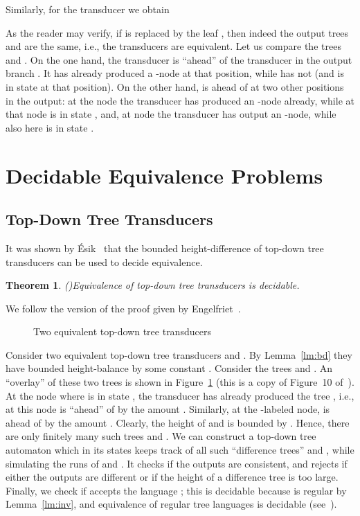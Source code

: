 \documentclass[copyright,creativecommons]{eptcs}
\newtheorem{theorem}{Theorem}
\newcommand{\eop}{\hspace*{\fill}}
\newenvironment{proof}{{\it Proof.}\quad}{\eop\vspace*{4mm}}
\begin{document}
Similarly, for the transducer  we obtain

As the reader may verify, if  is replaced by the leaf , then
indeed the output trees  and  are the same, i.e.,
the transducers are equivalent.
Let us compare the trees  and .
On the one hand, the transducer  is ``ahead'' of the transducer
 in the output branch . It has already produced a -node at
that position, while  has not (and is in state  at that position).
On the other hand,  is ahead of  at two other positions in the
output: at the node  the transducer  has produced an -node
already, while  at that node is in state , and,
at node  the transducer  has output an -node, while
also here  is in state .

\section{Decidable Equivalence Problems}\label{sect:equiv}

\subsection{Top-Down Tree Transducers}\label{sect:td}

It was shown by {\'E}sik~\cite{DBLP:journals/actaC/Esik81} 
that the bounded height-difference 
of top-down tree transducers can be used to decide equivalence. 

\begin{theorem}\rm(\cite{DBLP:journals/actaC/Esik81})\label{theo:Esik}
Equivalence of top-down tree transducers is decidable.
\end{theorem}
\begin{proof}
We follow the version of the proof given by Engelfriet~\cite{eng80}.
\begin{figure}[htb]
\centerline{}
\caption{Two equivalent top-down tree transducers}\label{fig:joost}
\end{figure}
Consider two equivalent top-down tree transducers  and .
By Lemma~\ref{lm:bd} they have bounded height-balance by some constant .
Consider the trees  and
. An ``overlay'' of these two trees is
shown in Figure~\ref{fig:joost} (this is a copy of Figure~10 of~\cite{eng80}).
At the node where  is in state , the transducer  has
already produced the tree , i.e., at this node 
 is ``ahead'' of  by the amount .
Similarly, at the -labeled node,  is ahead of 
by the amount .
Clearly, the height of  and  is bounded by . 
Hence, there are only finitely many such trees  and .
We can construct a top-down tree automaton  which in its states
keeps track of all such ``difference trees''  and , while
simulating the runs of  and . It checks if the outputs are
consistent, and rejects if either the outputs are different or if 
the height of a difference tree is too large.
Finally, we check if  accepts the language ; this is
decidable because  is regular by Lemma~\ref{lm:inv}, and equivalence
of regular tree languages is decidable (see~\cite{tata07}).
\end{proof}
\end{document}
